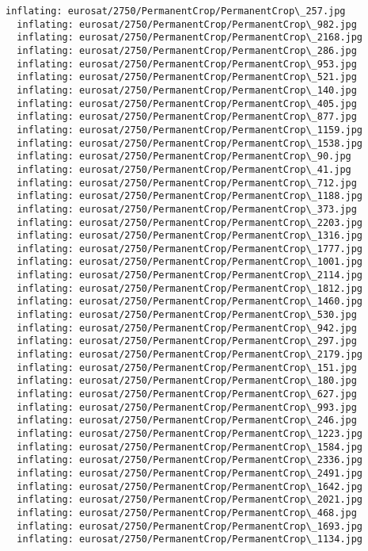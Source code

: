 \documentclass[11pt]{article}
\begin{document}
\begin{Verbatim}[commandchars=\\\{\}]
  inflating: eurosat/2750/PermanentCrop/PermanentCrop\_257.jpg
  inflating: eurosat/2750/PermanentCrop/PermanentCrop\_982.jpg
  inflating: eurosat/2750/PermanentCrop/PermanentCrop\_2168.jpg
  inflating: eurosat/2750/PermanentCrop/PermanentCrop\_286.jpg
  inflating: eurosat/2750/PermanentCrop/PermanentCrop\_953.jpg
  inflating: eurosat/2750/PermanentCrop/PermanentCrop\_521.jpg
  inflating: eurosat/2750/PermanentCrop/PermanentCrop\_140.jpg
  inflating: eurosat/2750/PermanentCrop/PermanentCrop\_405.jpg
  inflating: eurosat/2750/PermanentCrop/PermanentCrop\_877.jpg
  inflating: eurosat/2750/PermanentCrop/PermanentCrop\_1159.jpg
  inflating: eurosat/2750/PermanentCrop/PermanentCrop\_1538.jpg
  inflating: eurosat/2750/PermanentCrop/PermanentCrop\_90.jpg
  inflating: eurosat/2750/PermanentCrop/PermanentCrop\_41.jpg
  inflating: eurosat/2750/PermanentCrop/PermanentCrop\_712.jpg
  inflating: eurosat/2750/PermanentCrop/PermanentCrop\_1188.jpg
  inflating: eurosat/2750/PermanentCrop/PermanentCrop\_373.jpg
  inflating: eurosat/2750/PermanentCrop/PermanentCrop\_2203.jpg
  inflating: eurosat/2750/PermanentCrop/PermanentCrop\_1316.jpg
  inflating: eurosat/2750/PermanentCrop/PermanentCrop\_1777.jpg
  inflating: eurosat/2750/PermanentCrop/PermanentCrop\_1001.jpg
  inflating: eurosat/2750/PermanentCrop/PermanentCrop\_2114.jpg
  inflating: eurosat/2750/PermanentCrop/PermanentCrop\_1812.jpg
  inflating: eurosat/2750/PermanentCrop/PermanentCrop\_1460.jpg
  inflating: eurosat/2750/PermanentCrop/PermanentCrop\_530.jpg
  inflating: eurosat/2750/PermanentCrop/PermanentCrop\_942.jpg
  inflating: eurosat/2750/PermanentCrop/PermanentCrop\_297.jpg
  inflating: eurosat/2750/PermanentCrop/PermanentCrop\_2179.jpg
  inflating: eurosat/2750/PermanentCrop/PermanentCrop\_151.jpg
  inflating: eurosat/2750/PermanentCrop/PermanentCrop\_180.jpg
  inflating: eurosat/2750/PermanentCrop/PermanentCrop\_627.jpg
  inflating: eurosat/2750/PermanentCrop/PermanentCrop\_993.jpg
  inflating: eurosat/2750/PermanentCrop/PermanentCrop\_246.jpg
  inflating: eurosat/2750/PermanentCrop/PermanentCrop\_1223.jpg
  inflating: eurosat/2750/PermanentCrop/PermanentCrop\_1584.jpg
  inflating: eurosat/2750/PermanentCrop/PermanentCrop\_2336.jpg
  inflating: eurosat/2750/PermanentCrop/PermanentCrop\_2491.jpg
  inflating: eurosat/2750/PermanentCrop/PermanentCrop\_1642.jpg
  inflating: eurosat/2750/PermanentCrop/PermanentCrop\_2021.jpg
  inflating: eurosat/2750/PermanentCrop/PermanentCrop\_468.jpg
  inflating: eurosat/2750/PermanentCrop/PermanentCrop\_1693.jpg
  inflating: eurosat/2750/PermanentCrop/PermanentCrop\_1134.jpg

\end{Verbatim}
\end{document}
